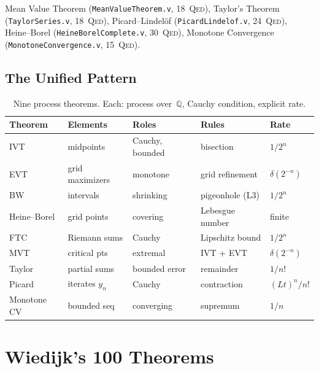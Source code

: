\documentclass[11pt,a4paper]{article}
\theoremstyle{definition}
\theoremstyle{remark}
\newcommand{\Qed}{\textsc{Qed}}
\begin{document}
Mean Value Theorem (\texttt{MeanValueTheorem.v}, 18~\Qed), Taylor's Theorem (\texttt{TaylorSeries.v}, 18~\Qed), Picard--Lindel\"of (\texttt{PicardLindelof.v}, 24~\Qed), Heine--Borel (\texttt{HeineBorelComplete.v}, 30~\Qed), Monotone Convergence (\texttt{MonotoneConvergence.v}, 15~\Qed).

\subsection{The Unified Pattern}

\begin{table}[h]
\centering
\small
\begin{tabular}{@{}lllll@{}}
\toprule
Theorem & Elements & Roles & Rules & Rate \\
\midrule
IVT          & midpoints       & Cauchy, bounded  & bisection           & $1/2^n$ \\
EVT          & grid maximizers & monotone         & grid refinement     & $\delta(2^{-n})$ \\
BW           & intervals       & shrinking        & pigeonhole (L3)     & $1/2^n$ \\
Heine--Borel & grid points     & covering         & Lebesgue number     & finite \\
FTC          & Riemann sums    & Cauchy           & Lipschitz bound     & $1/2^n$ \\
MVT          & critical pts    & extremal         & IVT + EVT           & $\delta(2^{-n})$ \\
Taylor       & partial sums    & bounded error    & remainder           & $1/n!$ \\
Picard       & iterates $y_n$  & Cauchy           & contraction         & $(Lt)^n/n!$ \\
Monotone CV  & bounded seq     & converging       & supremum            & $1/n$ \\
\bottomrule
\end{tabular}
\caption{Nine process theorems.  Each: process over~$\mathbb{Q}$, Cauchy condition, explicit rate.}
\label{tab:err}
\end{table}


\section{Wiedijk's 100 Theorems}
\label{sec:wiedijk}
\end{document}
